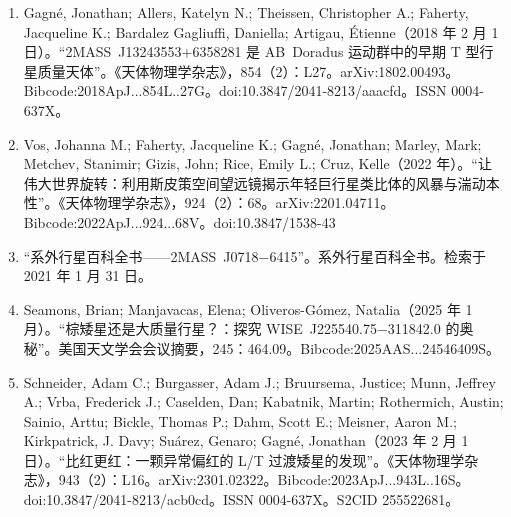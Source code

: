 \begin{enumerate}
\item Gagné, Jonathan; Allers, Katelyn N.; Theissen, Christopher A.; Faherty, Jacqueline K.; Bardalez Gagliuffi, Daniella; Artigau, Étienne（2018 年 2 月 1 日）。“2MASS~J13243553+6358281 是 AB~Doradus 运动群中的早期 T 型行星质量天体”。《天体物理学杂志》，854（2）：L27。arXiv:1802.00493。Bibcode:2018ApJ...854L..27G。doi:10.3847/2041-8213/aaacfd。ISSN 0004-637X。  
\item Vos, Johanna M.; Faherty, Jacqueline K.; Gagné, Jonathan; Marley, Mark; Metchev, Stanimir; Gizis, John; Rice, Emily L.; Cruz, Kelle（2022 年）。“让伟大世界旋转：利用斯皮策空间望远镜揭示年轻巨行星类比体的风暴与湍动本性”。《天体物理学杂志》，924（2）：68。arXiv:2201.04711。Bibcode:2022ApJ...924...68V。doi:10.3847/1538-43
\item “系外行星百科全书——2MASS~J0718$-$6415”。系外行星百科全书。检索于 2021 年 1 月 31 日。  
\item Seamons, Brian; Manjavacas, Elena; Oliveros-Gómez, Natalia（2025 年 1 月）。“棕矮星还是大质量行星？：探究 WISE~J225540.75$-$311842.0 的奥秘”。美国天文学会会议摘要，245：464.09。Bibcode:2025AAS...24546409S。  
\item Schneider, Adam C.; Burgasser, Adam J.; Bruursema, Justice; Munn, Jeffrey A.; Vrba, Frederick J.; Caselden, Dan; Kabatnik, Martin; Rothermich, Austin; Sainio, Arttu; Bickle, Thomas P.; Dahm, Scott E.; Meisner, Aaron M.; Kirkpatrick, J. Davy; Suárez, Genaro; Gagné, Jonathan（2023 年 2 月 1 日）。“比红更红：一颗异常偏红的 L/T 过渡矮星的发现”。《天体物理学杂志》，943（2）：L16。arXiv:2301.02322。Bibcode:2023ApJ...943L..16S。doi:10.3847/2041-8213/acb0cd。ISSN 0004-637X。S2CID 255522681。



\end{enumerate}
